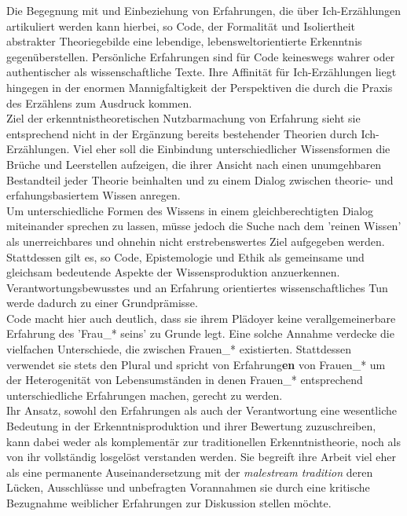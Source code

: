 Die Begegnung mit und Einbeziehung von Erfahrungen, die über Ich-Erzählungen
artikuliert werden kann hierbei, so Code, der Formalität und Isoliertheit
abstrakter Theoriegebilde eine lebendige, lebensweltorientierte Erkenntnis
gegenüberstellen. Persönliche Erfahrungen sind für Code keineswegs wahrer oder
authentischer als wissenschaftliche Texte. Ihre Affinität für Ich-Erzählungen
liegt hingegen in der enormen Mannigfaltigkeit der Perspektiven die durch die
Praxis des Erzählens zum Ausdruck kommen. \\
Ziel der erkenntnistheoretischen
Nutzbarmachung von Erfahrung sieht sie entsprechend nicht in der Ergänzung
bereits bestehender Theorien durch Ich-Erzählungen. Viel eher soll die
Einbindung unterschiedlicher Wissensformen die Brüche und Leerstellen aufzeigen,
die ihrer Ansicht nach einen unumgehbaren Bestandteil jeder Theorie beinhalten
und zu einem Dialog zwischen theorie- und erfahungsbasiertem Wissen anregen.\\
Um unterschiedliche Formen des Wissens in einem gleichberechtigten Dialog
miteinander sprechen zu lassen, müsse jedoch die Suche nach dem 'reinen Wissen'
als unerreichbares und ohnehin nicht erstrebenswertes Ziel aufgegeben
werden.\footnotemark {}\\
Stattdessen gilt es, so Code, Epistemologie und Ethik als gemeinsame und gleichsam bedeutende Aspekte der Wissensproduktion anzuerkennen. Verantwortungsbewusstes und an Erfahrung orientiertes wissenschaftliches Tun werde dadurch zu einer Grundprämisse.\\
Code macht hier auch deutlich, dass sie ihrem Plädoyer keine verallgemeinerbare
Erfahrung des 'Frau\_* seins' zu Grunde legt. Eine solche Annahme verdecke die
vielfachen Unterschiede, die zwischen Frauen\_* existierten. Stattdessen
verwendet sie stets den Plural und spricht von Erfahrung\textbf{en} von Frauen\_* um der
Heterogenität von Lebensumständen in denen Frauen\_* entsprechend
unterschiedliche Erfahrungen machen, gerecht zu werden.\footnotemark{}\\

\noindent Ihr Ansatz, sowohl den Erfahrungen als auch der Verantwortung eine wesentliche
Bedeutung in der Erkenntnisproduktion und ihrer Bewertung zuzuschreiben, kann
dabei weder als komplementär zur traditionellen Erkenntnistheorie, noch als von
ihr vollständig losgelöst verstanden werden. Sie begreift ihre Arbeit viel eher
als eine permanente Auseinandersetzung mit der \textit{malestream tradition} deren
Lücken, Ausschlüsse und unbefragten Vorannahmen sie durch eine kritische
Bezugnahme weiblicher Erfahrungen zur Diskussion stellen möchte.\footnotemark
{}\\

